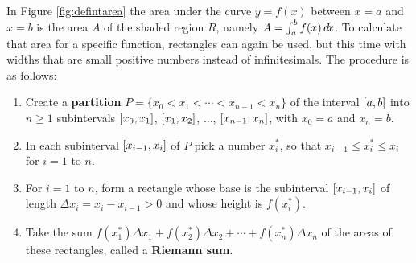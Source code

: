 In Figure \ref{fig:defintarea} the area under the curve $y=f(x)$ between $x=a$
and $x=b$ is the area $A$ of the shaded region $R$, namely
$A = \int_a^bf(x)\,d\!x$. To calculate that area for a specific function,
rectangles can again be used, but this time with widths that are small positive
numbers instead of infinitesimals. The procedure is as follows:

\begin{enumerate}[\bfseries 1.]
 \item Create a \textbf{partition} $P = \lbrace x_0 < x_1 < \cdots < x_{n-1}
  < x_n \rbrace$ of the interval $\lbrack a,b \rbrack$ into $n \ge 1$ subintervals
  $\lbrack x_0,x_1 \rbrack$, $\lbrack x_1,x_2 \rbrack$, $\ldots$, $\lbrack x_{n-1},x_n \rbrack$, with
  $x_0 = a$ and $x_n = b$.
 \item In each subinterval $\lbrack x_{i-1},x_i \rbrack$ of $P$ pick a
  number $x_i^*$, so that $x_{i-1} \le x_i^* \le x_i$ for $i=1$ to $n$.
 \item For $i=1$ to $n$, form a rectangle whose base is the subinterval
  $\lbrack x_{i-1},x_i \rbrack$ of length $\Delta x_i = x_i - x_{i-1} > 0$ and whose
  height is $f(x_i^*)$.
 \item Take the sum $f(x_1^*) \Delta x_1 + f(x_2^*) \Delta x_2 + \cdots +
  f(x_n^*) \Delta x_n$ of the areas of these rectangles, called a
  \textbf{Riemann sum}.


\end{enumerate}
